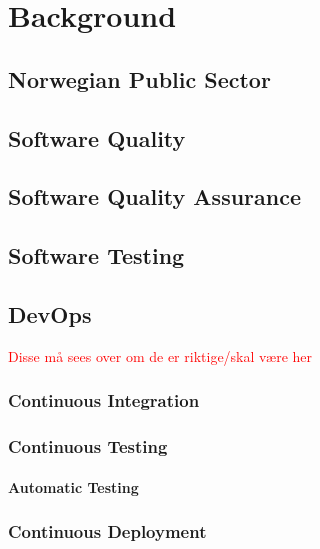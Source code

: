 \chapter{Background}

\section{Norwegian Public Sector}

\section{Software Quality}

\section{Software Quality Assurance}

\section{Software Testing}

\section{DevOps}

\textcolor{red}{Disse må sees over om de er riktige/skal være her}
\subsection{Continuous Integration}

\subsection{Continuous Testing}

\subsubsection{Automatic Testing}


\subsection{Continuous Deployment}